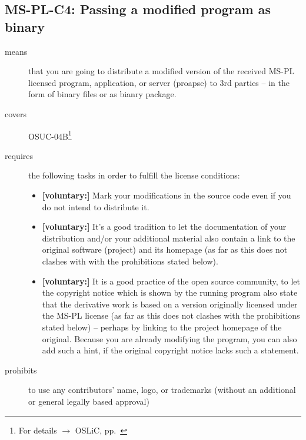 \subsection{MS-PL-C4: Passing a modified program as binary}
\label{OSUC-04B-MS-PL}

\begin{description}

\item[means] that you are going to distribute a modified version of the received
MS-PL licensed program, application, or server (proapse) to 3rd parties -- in
the form of binary files or as bianry package.

\item[covers] OSUC-04B\footnote{For details $\rightarrow$ OSLiC, pp.\
\pageref{OSUC-04B-DEF}}

\item[requires] the following tasks in order to fulfill the license conditions:
\begin{itemize}
  
  \item \textbf{[voluntary:]} Mark your modifications in the source code even if
  you do not intend to distribute it.
  
  \item \textbf{[voluntary:]} It's a good tradition to let the documentation of
  your distribution and/or your additional material also contain a link to the
  original software (project) and its homepage (as far as this does not clashes
  with with the prohibitions stated below).
  
  \item \textbf{[voluntary:]} It is a good practice of the open source
  community, to let the copyright notice which is shown by the running program
  also state that the derivative work is based on a version originally licensed
  under the MS-PL license (as far as this does not clashes with the prohibitions
  stated below) -- perhaps by linking to the project homepage of the original.
  Because you are already modifying the program, you can also add such a hint,
  if the original copyright notice lacks such a statement.
    
\end{itemize}

\item[prohibits] to use any contributors' name, logo, or trademarks (without an
additional or general legally based approval)

\end{description}




